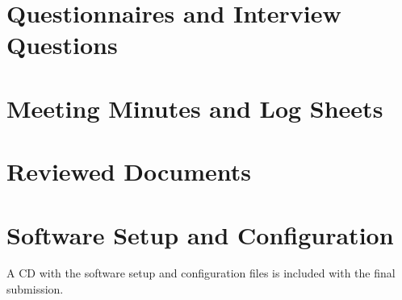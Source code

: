 \documentclass[12pt,a4paper]{report}
\begin{document}
\section{Questionnaires and Interview Questions}

\section{Meeting Minutes and Log Sheets}

\section{Reviewed Documents}

\section{Software Setup and Configuration}
A CD with the software setup and configuration files is included with the final submission.

\end{document}
